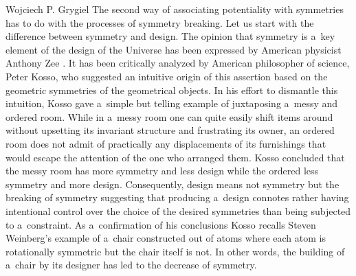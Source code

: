 \begin{artengenv}{Wojciech P. Grygiel}
The second way of associating potentiality with symmetries has to do with the processes of symmetry breaking. Let us start with the difference between symmetry and design. The opinion that symmetry is a~key element of the design of the Universe has been expressed by American physicist Anthony Zee 
\parencite*[][pp.3]{zee_fearful_2007}. %
 It has been critically analyzed by American philosopher of science, Peter Kosso, who suggested an intuitive origin of this assertion based on the geometric symmetries of the geometrical objects. In his effort to dismantle this intuition, Kosso 
\parencite*[][p.421]{brading_symmetry_2003} %
 gave a~simple but telling example of juxtaposing a~messy and ordered room. While in a~messy room one can quite easily shift items around without upsetting its invariant structure and frustrating its owner, an ordered room does not admit of practically any displacements of its furnishings that would escape the attention of the one who arranged them. Kosso concluded that the messy room has more symmetry and less design while the ordered less symmetry and more design. Consequently, design means not symmetry but the breaking of symmetry suggesting that producing a~design connotes rather having intentional control over the choice of the desired symmetries than being subjected to a~constraint. As a~confirmation of his conclusions Kosso recalls Steven Weinberg's example of a~chair constructed out of atoms where each atom is rotationally symmetric but the chair itself is not. In other words, the building of a~chair by its designer has led to the decrease of symmetry.




\end{artengenv}
